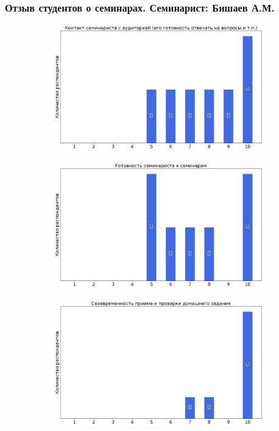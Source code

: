         
    \subsubsection{Отзыв студентов о семинарах. Семинарист: Бишаев А.М.}
		\begin{figure}[H]
			\centering
			\begin{subfigure}[b]{0.45\textwidth}
				\centering
				\includegraphics[width=\textwidth]{images/2 course/Дифференциальные уравнения/seminarists-marks-Бишаев А.М.-0.png}
			\end{subfigure}
			\begin{subfigure}[b]{0.45\textwidth}
				\centering
				\includegraphics[width=\textwidth]{images/2 course/Дифференциальные уравнения/seminarists-marks-Бишаев А.М.-1.png}
			\end{subfigure}
			\begin{subfigure}[b]{0.45\textwidth}
				\centering
				\includegraphics[width=\textwidth]{images/2 course/Дифференциальные уравнения/seminarists-marks-Бишаев А.М.-2.png}

\end{subfigure}
\end{figure}

